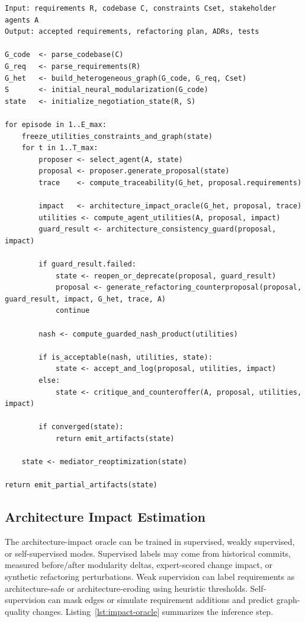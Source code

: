 \documentclass[english,preprint,nonatbib]{elsarticle}
\begin{document}
\begin{lstlisting}[caption={DeepArchNegotiator main loop.},label={lst:main-loop}]
Input: requirements R, codebase C, constraints Cset, stakeholder agents A
Output: accepted requirements, refactoring plan, ADRs, tests

G_code  <- parse_codebase(C)
G_req   <- parse_requirements(R)
G_het   <- build_heterogeneous_graph(G_code, G_req, Cset)
S       <- initial_neural_modularization(G_code)
state   <- initialize_negotiation_state(R, S)

for episode in 1..E_max:
    freeze_utilities_constraints_and_graph(state)
    for t in 1..T_max:
        proposer <- select_agent(A, state)
        proposal <- proposer.generate_proposal(state)
        trace    <- compute_traceability(G_het, proposal.requirements)
        
        impact   <- architecture_impact_oracle(G_het, proposal, trace)
        utilities <- compute_agent_utilities(A, proposal, impact)
        guard_result <- architecture_consistency_guard(proposal, impact)

        if guard_result.failed:
            state <- reopen_or_deprecate(proposal, guard_result)
            proposal <- generate_refactoring_counterproposal(proposal, guard_result, impact, G_het, trace, A)
            continue

        nash <- compute_guarded_nash_product(utilities)
 
        if is_acceptable(nash, utilities, state):
            state <- accept_and_log(proposal, utilities, impact)
        else:
            state <- critique_and_counteroffer(A, proposal, utilities, impact)

        if converged(state):
            return emit_artifacts(state)

    state <- mediator_reoptimization(state)

return emit_partial_artifacts(state)
\end{lstlisting}

\subsection{Architecture Impact Estimation}

The architecture-impact oracle can be trained in supervised, weakly supervised, or self-supervised modes.
Supervised labels may come from historical commits, measured before/after modularity deltas, expert-scored change impact, or synthetic refactoring perturbations.
Weak supervision can label requirements as architecture-safe or architecture-eroding using heuristic thresholds.
Self-supervision can mask edges or simulate requirement additions and predict graph-quality changes. Listing~\ref{lst:impact-oracle} summarizes the inference step.
\end{document}
